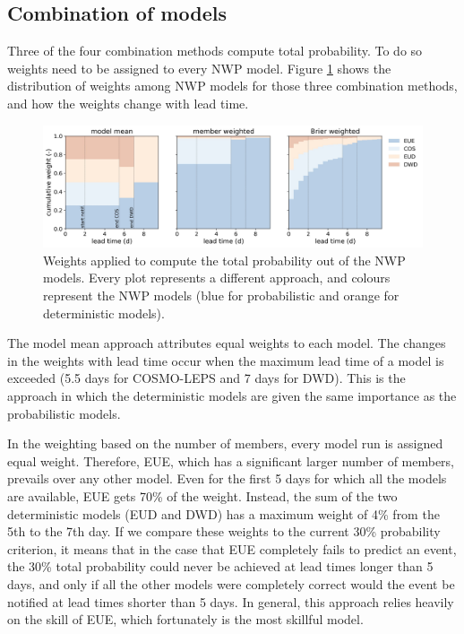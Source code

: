 \documentclass[preprint,12pt]{elsarticle}
\begin{document}
\subsection{Combination of models}

Three of the four combination methods compute total probability. To do so weights need to be assigned to every NWP model. Figure \ref{fig:weights} shows the distribution of weights among NWP models for those three combination methods, and how the weights change with lead time.

\begin{figure}
    \centering
    \includegraphics[width=1\textwidth]{figures/weights.jpg}
    \caption{Weights applied to compute the total probability out of the NWP models. Every plot represents a different approach, and colours represent the NWP models (blue for probabilistic and orange for deterministic models).}
    \label{fig:weights}
\end{figure}

The model mean approach attributes equal weights to each model. The changes in the weights with lead time occur when the maximum lead time of a model is exceeded (5.5 days for COSMO-LEPS and 7 days for DWD). This is the approach in which the deterministic models are given the same importance as the probabilistic models.

In the weighting based on the number of members, every model run is assigned equal weight. Therefore, EUE, which has a significant larger number of members, prevails over any other model. Even for the first 5 days for which all the models are available, EUE gets 70\% of the weight. Instead, the sum of the two deterministic models (EUD and DWD) has a maximum weight of 4\% from the 5th to the 7th day. If we compare these weights to the current 30\% probability criterion, it means that in the case that EUE completely fails to predict an event, the 30\% total probability could never be achieved at lead times longer than 5 days, and only if all the other models were completely correct would the event be notified at lead times shorter than 5 days. In general, this approach relies heavily on the skill of EUE, which fortunately is the most skillful model.
\end{document}
